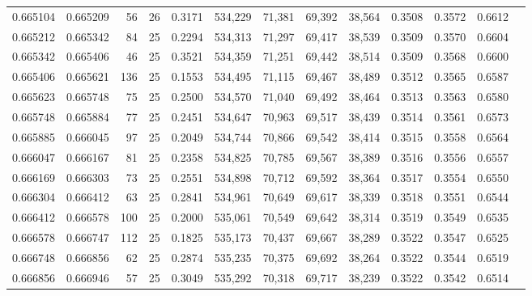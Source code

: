 \begin{tabular}{rrrrrrrrrrrrr}
0.665104 & 0.665209 &    56 &  26 &                                     0.3171 & 534,229 &  71,381 &  69,392 &  38,564 & 0.3508 & 0.3572 & 0.6612 \\
0.665212 & 0.665342 &    84 &  25 &                                     0.2294 & 534,313 &  71,297 &  69,417 &  38,539 & 0.3509 & 0.3570 & 0.6604 \\
0.665342 & 0.665406 &    46 &  25 &                                     0.3521 & 534,359 &  71,251 &  69,442 &  38,514 & 0.3509 & 0.3568 & 0.6600 \\
0.665406 & 0.665621 &   136 &  25 &                                     0.1553 & 534,495 &  71,115 &  69,467 &  38,489 & 0.3512 & 0.3565 & 0.6587 \\
0.665623 & 0.665748 &    75 &  25 &                                     0.2500 & 534,570 &  71,040 &  69,492 &  38,464 & 0.3513 & 0.3563 & 0.6580 \\
0.665748 & 0.665884 &    77 &  25 &                                     0.2451 & 534,647 &  70,963 &  69,517 &  38,439 & 0.3514 & 0.3561 & 0.6573 \\
0.665885 & 0.666045 &    97 &  25 &                                     0.2049 & 534,744 &  70,866 &  69,542 &  38,414 & 0.3515 & 0.3558 & 0.6564 \\
0.666047 & 0.666167 &    81 &  25 &                                     0.2358 & 534,825 &  70,785 &  69,567 &  38,389 & 0.3516 & 0.3556 & 0.6557 \\
0.666169 & 0.666303 &    73 &  25 &                                     0.2551 & 534,898 &  70,712 &  69,592 &  38,364 & 0.3517 & 0.3554 & 0.6550 \\
0.666304 & 0.666412 &    63 &  25 &                                     0.2841 & 534,961 &  70,649 &  69,617 &  38,339 & 0.3518 & 0.3551 & 0.6544 \\
0.666412 & 0.666578 &   100 &  25 &                                     0.2000 & 535,061 &  70,549 &  69,642 &  38,314 & 0.3519 & 0.3549 & 0.6535 \\
0.666578 & 0.666747 &   112 &  25 &                                     0.1825 & 535,173 &  70,437 &  69,667 &  38,289 & 0.3522 & 0.3547 & 0.6525 \\
0.666748 & 0.666856 &    62 &  25 &                                     0.2874 & 535,235 &  70,375 &  69,692 &  38,264 & 0.3522 & 0.3544 & 0.6519 \\
0.666856 & 0.666946 &    57 &  25 &                                     0.3049 & 535,292 &  70,318 &  69,717 &  38,239 & 0.3522 & 0.3542 & 0.6514 \\

\end{tabular}
